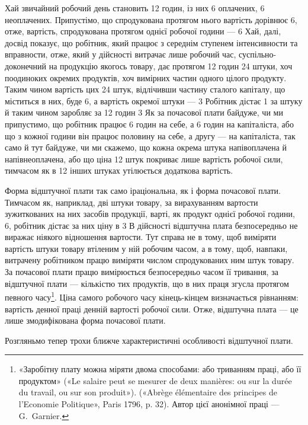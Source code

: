 Хай звичайний робочий день становить 12 годин, із них 6
оплачених, 6 неоплачених. Припустімо, що спродукована протягом
нього вартість дорівнює 6, отже, вартість, спродукована
протягом однієї робочої години — 6 Хай,
далі, досвід показує, що робітник, який працює з середнім
ступенем інтенсивности та вправности, отже, який у дійсності
витрачає лише робочий час, суспільно-доконечний на продукцію
якогось товару, дає протягом 12 годин 24 штуки, хоч поодиноких
окремих продуктів, хоч вимірних частин одного цілого продукту.
Таким чином вартість цих 24 штук, відлічивши частину
сталого капіталу, що міститься в них, буде 6, а вартість
окремої штуки — 3 Робітник дістає 1 за
штуку й таким чином заробляє за 12 годин 3 Як за
почасової плати байдуже, чи ми припустимо, що робітник працює
6 годин на себе, а 6 годин на капіталіста, або що з кожної години
він працює половину на себе, а другу — на капіталіста, так само
й тут байдуже, чи ми скажемо, що кожна окрема штука напівоплачена
й напівнеоплачена, або що ціна 12 штук покриває лише
вартість робочої сили, тимчасом як в 12 інших штуках утілюється
додаткова вартість.

Форма відштучної плати так само іраціональна, як і форма
почасової плати. Тимчасом як, наприклад, дві штуки товару,
за вирахуванням вартости зужиткованих на них засобів продукції,
варті, як продукт однієї робочої години, 6, робітник дістає
за них ціну в 3 В дійсності відштучна плата безпосередньо
не виражає ніякого відношення вартости. Тут справа не в тому,
щоб виміряти вартість штуки товару втіленим у ній робочим
часом, а в тому, щоб, навпаки, витрачену робітником працю виміряти
числом спродукованих ним штук товару. За почасової
плати працю вимірюється безпосередньо часом її тривання, за
відштучної плати — кількістю тих продуктів, що в них праця
згусла протягом певного часу\footnote{
«Заробітну плату можна міряти двома способами: або триванням
праці, або її продуктом» («Le salaire peut se mesurer de deux manières:
ou sur la durée du travail, ou sur son produit»). («Abrège élémentaire des
principes de l’Economie Politique», Paris 1796, p. 32). Автор цієї анонімної
праці — G.~Garnier.
}. Ціна самого робочого часу кінець-кінцем
визначається рівнанням: вартість денної праці \deq{}
денній вартості робочої сили. Отже, відштучна плата — це лише
змодифікована форма почасової плати.

Розгляньмо тепер трохи ближче характеристичні особливості
відштучної плати.

